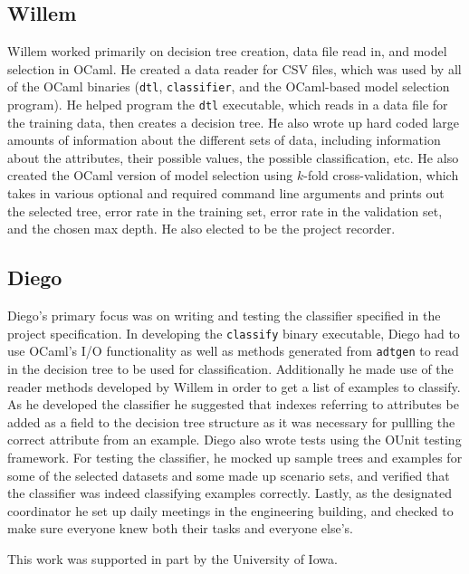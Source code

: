 \documentclass[screen, authorversion, nonacm, sigconf]{acmart}
\begin{document}
\subsection{Willem}

Willem worked primarily on decision tree creation, data file read in, and model selection in OCaml. He created a data reader for CSV files, which was used by all of the OCaml binaries (\texttt{dtl}, \texttt{classifier}, and the OCaml-based model selection program). He helped program the \texttt{dtl} executable, which reads in a data file for the training data, then creates a decision tree. He also wrote up hard coded large amounts of information about the different sets of data, including information about the attributes, their possible values, the possible classification, etc. He also created the OCaml version of model selection using $k$-fold cross-validation, which takes in various optional and required command line arguments and prints out the selected tree, error rate in the training set, error rate in the validation set, and the chosen max depth. He also elected to be the project recorder.

\subsection{Diego}

Diego's primary focus was on writing and testing the classifier specified in the project specification. In developing the \texttt{classify} binary executable, Diego had to use OCaml's I/O functionality as well as methods generated from \texttt{adtgen} to read in the decision tree to be used for classification. Additionally he made use of the reader methods developed by Willem in order to get a list of examples to classify. As he developed the classifier he suggested that indexes referring to attributes be added as a field to the decision tree structure as it was necessary for pullling the correct attribute from an example. Diego also wrote tests using the OUnit testing framework. For testing the classifier, he mocked up sample trees and examples for some of the selected datasets and some made up scenario sets, and verified that the classifier was indeed classifying examples correctly. Lastly, as the designated coordinator he set up daily meetings in the engineering building, and checked to make sure everyone knew both their tasks and everyone else's.

\begin{acks}
This work was supported in part by the University of Iowa.
\end{acks}
\end{document}
